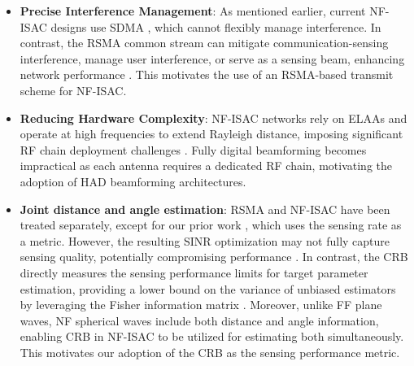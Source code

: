 \documentclass[10pt,journal,twocolumn]{IEEEtran}
\begin{document}
\begin{itemize}
\item \textbf{Precise Interference Management}: As mentioned earlier,  current NF-ISAC designs use SDMA \cite{10520715,10694020,hua2024near,10681603,10135096,meng2024hybrid,10700785,10579914}, which cannot flexibly manage interference. In contrast, the RSMA common stream can mitigate communication-sensing interference, manage user interference, or serve as a sensing beam, enhancing network performance \cite{9531484}. This motivates the use of an RSMA-based transmit scheme for NF-ISAC.

\item \textbf{Reducing Hardware Complexity}: NF-ISAC networks rely on ELAAs and operate at high frequencies to extend Rayleigh distance, imposing significant RF chain deployment challenges \cite{10579914,10135096}. Fully digital beamforming becomes impractical as each antenna requires a dedicated RF chain, motivating the adoption of HAD beamforming architectures.




\item \textbf{Joint distance and angle estimation}: RSMA and NF-ISAC have been treated separately, except for our prior work \cite{zhou2024hybrid}, which uses the sensing rate as a metric. However, the resulting SINR optimization may not fully capture sensing quality, potentially compromising performance \cite{10050406}. In contrast, the CRB directly measures the sensing performance limits for target parameter estimation, providing a lower bound on the variance of unbiased estimators by leveraging the Fisher information matrix \cite{9705498}. Moreover, unlike FF plane waves, NF spherical waves include both distance and angle information, enabling CRB in NF-ISAC to be utilized for estimating both simultaneously. This motivates our adoption of the CRB as the sensing performance metric.
\end{itemize}
\end{document}
